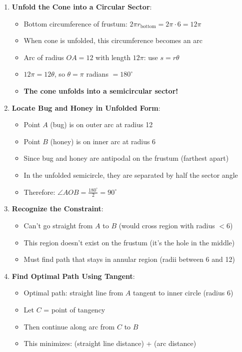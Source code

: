 \documentclass[12pt]{article}
\begin{document}
\begin{solutionbox}
\begin{enumerate}[leftmargin=*]
    \item \textbf{Unfold the Cone into a Circular Sector}: 
    \begin{itemize}
        \item Bottom circumference of frustum: $2\pi r_{\text{bottom}} = 2\pi \cdot 6 = 12\pi$
        \item When cone is unfolded, this circumference becomes an arc
        \item Arc of radius $OA = 12$ with length $12\pi$: use $s = r\theta$
        \item $12\pi = 12\theta$, so $\theta = \pi$ radians $= 180^\circ$
        \item \textbf{The cone unfolds into a semicircular sector!}
    \end{itemize}
    
    \item \textbf{Locate Bug and Honey in Unfolded Form}: 
    \begin{itemize}
        \item Point $A$ (bug) is on outer arc at radius 12
        \item Point $B$ (honey) is on inner arc at radius 6
        \item Since bug and honey are antipodal on the frustum (farthest apart)
        \item In the unfolded semicircle, they are separated by half the sector angle
        \item Therefore: $\angle AOB = \frac{180^\circ}{2} = 90^\circ$
    \end{itemize}
    
    \item \textbf{Recognize the Constraint}: 
    \begin{itemize}
        \item Can't go straight from $A$ to $B$ (would cross region with radius $< 6$)
        \item This region doesn't exist on the frustum (it's the hole in the middle)
        \item Must find path that stays in annular region (radii between 6 and 12)
    \end{itemize}
    
    \item \textbf{Find Optimal Path Using Tangent}: 
    \begin{itemize}
        \item Optimal path: straight line from $A$ tangent to inner circle (radius 6)
        \item Let $C$ = point of tangency
        \item Then continue along arc from $C$ to $B$
        \item This minimizes: (straight line distance) + (arc distance)
    \end{itemize}
    

\end{enumerate}
\end{solutionbox}
\end{document}
